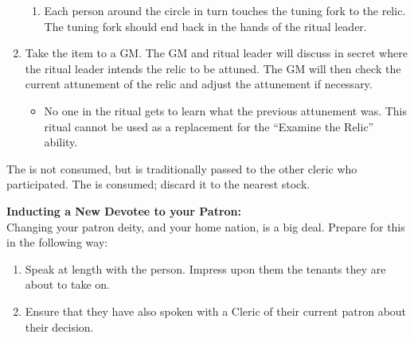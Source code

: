 \documentclass[green]{GL2020}
\begin{document}
\begin{enumerate}
\begin{enumerate}
      \item Each person around the circle in turn touches the tuning fork to the relic. The tuning fork should end back in the hands of the ritual leader.
    \end{enumerate}
    \item Take the item to a GM. The GM and ritual leader will discuss in secret where the ritual leader intends the relic to be attuned. The GM will then check the current attunement of the relic and adjust the attunement if necessary.
    \begin{itemize}
      \item No one in the ritual gets to learn what the previous attunement was. This ritual cannot be used as a replacement for the ``Examine the Relic'' ability.
    \end{itemize}
  \end{enumerate}
The \iTuningFork{} is not consumed, but is traditionally passed to the other cleric who participated. The \iRitualCandle{} is consumed; discard it to the nearest stock.
   
\textbf{Inducting a New Devotee to your Patron:}\\
Changing your patron deity, and your home nation, is a big deal. Prepare for this in the following way:
  \begin{enumerate}
    \item Speak at length with the person. Impress upon them the tenants they are about to take on.
    \item Ensure that they have also spoken with a Cleric of their current patron about their decision.
  \end{enumerate}
  
\end{document}
